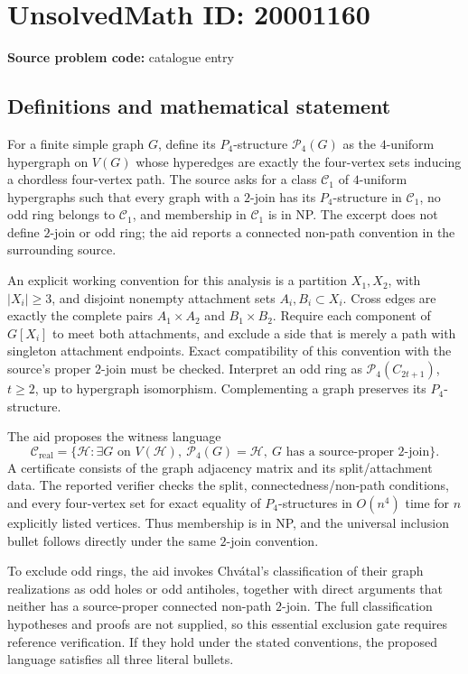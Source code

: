 \documentclass[11pt]{article}
\begin{document}
\section*{UnsolvedMath ID: 20001160}
\textbf{Source problem code:} catalogue entry
\subsection{Definitions and mathematical statement}
For a finite simple graph \(G\), define its \(P_4\)-structure \(\mathcal P_4(G)\) as the \(4\)-uniform hypergraph on \(V(G)\) whose hyperedges are exactly the four-vertex sets inducing a chordless four-vertex path. The source asks for a class \(\mathcal C_1\) of \(4\)-uniform hypergraphs such that every graph with a \(2\)-join has its \(P_4\)-structure in \(\mathcal C_1\), no odd ring belongs to \(\mathcal C_1\), and membership in \(\mathcal C_1\) is in NP. The excerpt does not define \(2\)-join or odd ring; the aid reports a connected non-path convention in the surrounding source.

An explicit working convention for this analysis is a partition \(X_1,X_2\), with \(|X_i|\ge3\), and disjoint nonempty attachment sets \(A_i,B_i\subset X_i\). Cross edges are exactly the complete pairs \(A_1\times A_2\) and \(B_1\times B_2\). Require each component of \(G[X_i]\) to meet both attachments, and exclude a side that is merely a path with singleton attachment endpoints. Exact compatibility of this convention with the source's proper \(2\)-join must be checked. Interpret an odd ring as \(\mathcal P_4(C_{2t+1})\), \(t\ge2\), up to hypergraph isomorphism. Complementing a graph preserves its \(P_4\)-structure.

The aid proposes the witness language
\[
 \mathcal C_{\mathrm{real}}=
 \{\mathcal H:\exists G\text{ on }V(\mathcal H),\
 \mathcal P_4(G)=\mathcal H,\ G\text{ has a source-proper }2\text{-join}\}.
\]
A certificate consists of the graph adjacency matrix and its split/attachment data. The reported verifier checks the split, connectedness/non-path conditions, and every four-vertex set for exact equality of \(P_4\)-structures in \(O(n^4)\) time for \(n\) explicitly listed vertices. Thus membership is in NP, and the universal inclusion bullet follows directly under the same \(2\)-join convention.

To exclude odd rings, the aid invokes Chv\'atal's classification of their graph realizations as odd holes or odd antiholes, together with direct arguments that neither has a source-proper connected non-path \(2\)-join. The full classification hypotheses and proofs are not supplied, so this essential exclusion gate requires reference verification. If they hold under the stated conventions, the proposed language satisfies all three literal bullets.
\end{document}
